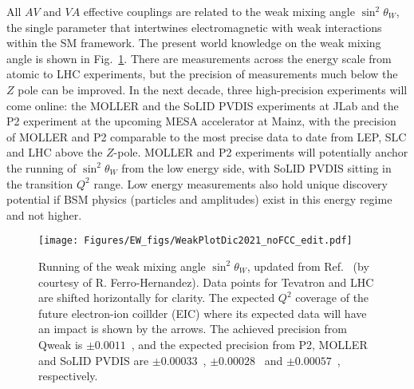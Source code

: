 All $AV$ and $VA$ effective couplings are related to the weak mixing angle $\sin^2\theta_W$, the single parameter that intertwines electromagnetic with weak interactions within the SM framework.  The present world knowledge on the weak mixing angle is shown in Fig.~\ref{fig:thetaW}. There are measurements across the energy scale from atomic to LHC experiments, but the precision of measurements much below the $Z$ pole can be improved. In the next decade, three high-precision experiments will come online: the MOLLER and the SoLID PVDIS experiments at JLab and the P2 experiment at the upcoming MESA accelerator at Mainz, with the precision of MOLLER and P2 comparable to the most precise data to date from LEP, SLC and LHC above the $Z$-pole. MOLLER and P2 experiments will potentially anchor the running of $\sin^2\theta_W$ from the low energy side, with SoLID PVDIS sitting in the transition $Q^2$ range. Low energy measurements also hold unique discovery potential if BSM physics (particles and amplitudes) exist in this energy regime and not higher. 

\begin{figure}[!ht]
\begin{center}
\texttt{[image: Figures/EW\_figs/WeakPlotDic2021\_noFCC\_edit.pdf]}
\end{center}
\caption{Running of the weak mixing angle $\sin^2\theta_W$, updated from Ref.~\cite{Erler:2017knj} (by courtesy of R. Ferro-Hernandez). Data points for Tevatron and LHC are shifted horizontally for clarity. The expected $Q^2$ coverage of the future electron-ion coillder (EIC) where its expected data will have an impact is shown by the arrows. The achieved precision from Qweak is $\pm 0.0011$~\cite{Androic:2018kni}, and the expected precision from P2, MOLLER and SoLID PVDIS are $\pm 0.00033$~\cite{Becker:2018ggl}, $\pm 0.00028$~\cite{MOLLERCDR} and $\pm 0.00057$~\cite{Erler:2014fqa}, respectively.
}\label{fig:thetaW}
\end{figure}


